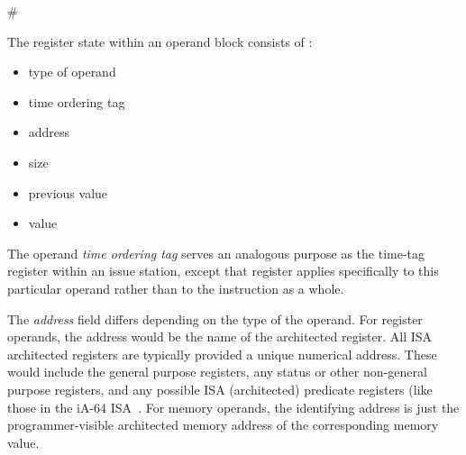 #\documentclass[10pt,dvips]{article}
\begin{document}
The register state within an operand block consists of :
%
\begin{itemize}
\vspace{-0.10in}
\item{type of operand}
\vspace{-0.10in}
\item{time ordering tag}
\vspace{-0.10in}
\item{address}
\vspace{-0.10in}
\item{size}
\vspace{-0.10in}
\item{previous value}
\vspace{-0.10in}
\item{value}
\vspace{-0.10in}
\end{itemize}   
%
The operand \textit{time ordering tag}
serves
an analogous purpose as the time-tag register within an issue station,
except that register applies specifically to this particular
operand rather than to the instruction as a whole.

The \textit{address} field differs
depending on the type of the operand.
For register operands, the address would be
the name of the architected register.
All ISA architected registers are typically provided a
unique numerical address.  These would include the
general purpose registers, any status or other non-general
purpose registers, and any possible ISA (architected) predicate registers
(like those in the iA-64 ISA~\cite{intel99ia,schlansker00epic}.
For memory operands, the identifying address is just the
programmer-visible architected memory address of the corresponding
memory value.
\end{document}
